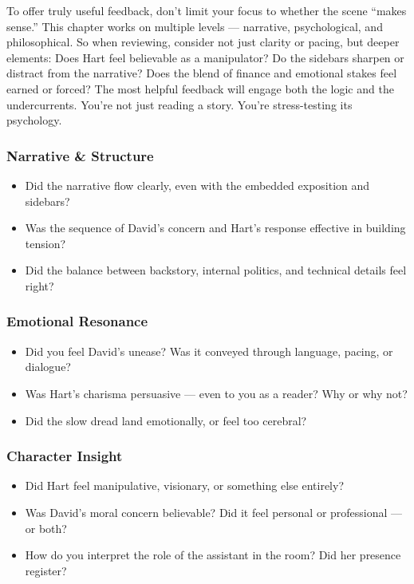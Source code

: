 To offer truly useful feedback, don’t limit your focus to whether the scene “makes sense.” This chapter works on multiple levels 
— narrative, psychological, and philosophical. So when reviewing, consider not just clarity or pacing, but deeper elements: Does 
Hart feel believable as a manipulator? Do the sidebars sharpen or distract from the narrative? Does the blend of finance and 
emotional stakes feel earned or forced? The most helpful feedback will engage both the logic and the undercurrents. You're not 
just reading a story. You're stress-testing its psychology.

\subsubsection{Narrative \& Structure}

\begin{itemize}
  \item Did the narrative flow clearly, even with the embedded exposition and sidebars?
  \item Was the sequence of David's concern and Hart’s response effective in building tension?
  \item Did the balance between backstory, internal politics, and technical details feel right?
\end{itemize}

\subsubsection{Emotional Resonance}

\begin{itemize}
  \item Did you feel David’s unease? Was it conveyed through language, pacing, or dialogue?
  \item Was Hart’s charisma persuasive — even to you as a reader? Why or why not?
  \item Did the slow dread land emotionally, or feel too cerebral?
\end{itemize}

\subsubsection{Character Insight}

\begin{itemize}
  \item Did Hart feel manipulative, visionary, or something else entirely?
  \item Was David’s moral concern believable? Did it feel personal or professional — or both?
  \item How do you interpret the role of the assistant in the room? Did her presence register?
\end{itemize}

